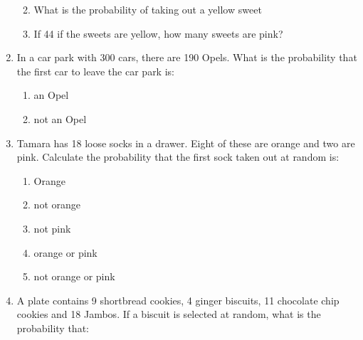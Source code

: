 \begin{enumerate}[noitemsep, label=\textbf{\arabic*}. ]
\begin{enumerate}[noitemsep, label=\textbf{\alph*}. ]
            \label{m39373*uid113}\item What is the probability of taking
out a yellow sweet
\label{m39373*uid114}\item If 44 if the sweets are yellow, how many sweets are
pink?
\end{enumerate}
                \label{m39373*uid115}\item In a car park with 300 cars, there are 190 Opels. What
is the probability that the first car to leave the car park is:
\label{m39373*id116044}\begin{enumerate}[noitemsep, label=\textbf{\alph*}. ] 
            \label{m39373*uid116}\item an Opel
\label{m39373*uid117}\item not an Opel
\end{enumerate}
                \label{m39373*uid118}\item Tamara has 18 loose socks in a drawer. Eight of these
are orange and two are pink. Calculate the probability that the first sock taken
out at random is:
\label{m39373*id116086}\begin{enumerate}[noitemsep, label=\textbf{\alph*}. ] 
            \label{m39373*uid119}\item Orange
\label{m39373*uid120}\item not orange
%     
\label{m39373*uid122}\item not pink
\label{m39373*uid123}\item orange or pink
\label{m39373*uid124}\item not orange or pink
\end{enumerate}
                \label{m39373*uid125}\item A plate contains 9 shortbread cookies, 4 ginger
biscuits, 11 chocolate chip cookies and 18 Jambos. If a biscuit is selected at
random, what is the probability that:

\end{enumerate}
